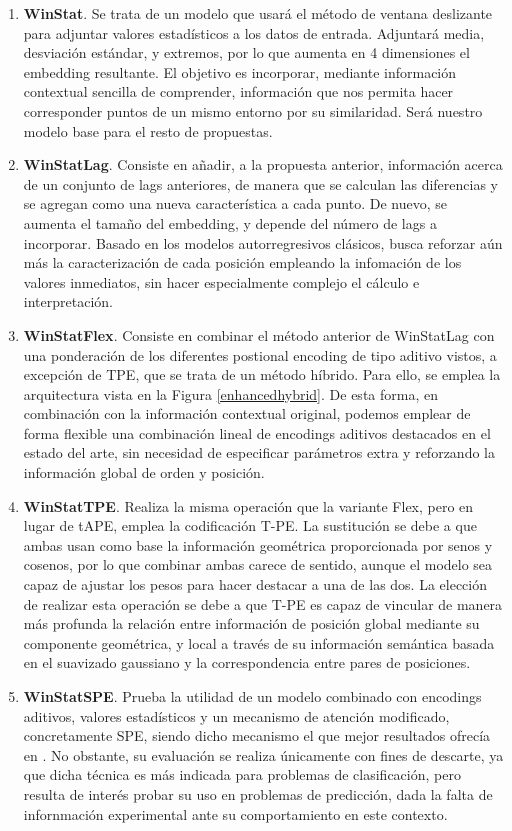 \begin{enumerate}
	\item \textbf{WinStat}. Se trata de un modelo que usará el método de ventana deslizante para adjuntar valores estadísticos a los datos de entrada. Adjuntará media, desviación estándar, y extremos, por lo que aumenta en 4 dimensiones el embedding resultante. El objetivo es incorporar, mediante información contextual sencilla de comprender, información que nos permita hacer corresponder puntos de un mismo entorno por su similaridad. Será nuestro modelo base para el resto de propuestas.
	\item \textbf{WinStatLag}. Consiste en añadir, a la propuesta anterior, información acerca de un conjunto de lags anteriores, de manera que se calculan las diferencias y se agregan como una nueva característica a cada punto. De nuevo, se aumenta el tamaño del embedding, y depende del número de lags a incorporar. Basado en los modelos autorregresivos clásicos, busca reforzar aún más la caracterización de cada posición empleando la infomación de los valores inmediatos, sin hacer especialmente complejo el cálculo e interpretación.
	\item \textbf{WinStatFlex}. Consiste en combinar el método anterior de WinStatLag con una ponderación de los diferentes postional encoding de tipo aditivo vistos, a excepción de TPE, que se trata de un método híbrido. Para ello, se emplea la arquitectura vista en la Figura \ref{enhancedhybrid}. De esta forma, en combinación con la información contextual original, podemos emplear de forma flexible una combinación lineal de encodings aditivos destacados en el estado del arte, sin necesidad de especificar parámetros extra y reforzando la información global de orden y posición.
	\item \textbf{WinStatTPE}. Realiza la misma operación que la variante Flex, pero en lugar de tAPE, emplea la codificación T-PE. La sustitución se debe a que ambas usan como base la información geométrica proporcionada por senos y cosenos, por lo que combinar ambas carece de sentido, aunque el modelo sea capaz de ajustar los pesos para hacer destacar a una de las dos. La elección de realizar esta operación se debe a que T-PE es capaz de vincular de manera más profunda la relación entre información de posición global mediante su componente geométrica, y local a través de su información semántica basada en el suavizado gaussiano y la correspondencia entre pares de posiciones.
	\item \textbf{WinStatSPE}. Prueba la utilidad de un modelo combinado con encodings aditivos, valores estadísticos y un mecanismo de atención modificado, concretamente SPE, siendo dicho mecanismo el que mejor resultados ofrecía en \cite{irani2025positionalencodingtransformerbasedtime}. No obstante, su evaluación se realiza únicamente con fines de descarte, ya que dicha técnica es más indicada para problemas de clasificación, pero resulta de interés probar su uso en problemas de predicción, dada la falta de infornmación experimental ante su comportamiento en este contexto.
\end{enumerate}

